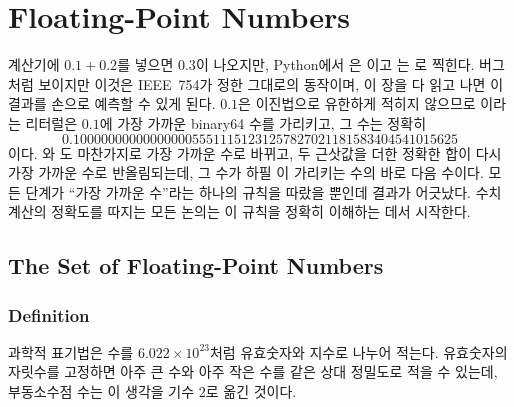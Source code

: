 \chapter{Floating-Point Numbers}
\label{ch:floating-point}


계산기에 $0.1+0.2$를 넣으면 $0.3$이 나오지만, Python에서 은 이고 는 로 찍힌다. 버그처럼 보이지만 이것은 IEEE~754가 정한 그대로의 동작이며, 이 장을 다 읽고 나면 이 결과를 손으로 예측할 수 있게 된다. $0.1$은 이진법으로 유한하게 적히지 않으므로 이라는 리터럴은 $0.1$에 가장 가까운 binary64 수를 가리키고, 그 수는 정확히
\[
0.1000000000000000055511151231257827021181583404541015625
\]
이다. 와 도 마찬가지로 가장 가까운 수로 바뀌고, 두 근삿값을 더한 정확한 합이 다시 가장 가까운 수로 반올림되는데, 그 수가 하필 이 가리키는 수의 바로 다음 수이다. 모든 단계가 ``가장 가까운 수''라는 하나의 규칙을 따랐을 뿐인데 결과가 어긋났다. 수치 계산의 정확도를 따지는 모든 논의는 이 규칙을 정확히 이해하는 데서 시작한다.

\section{The Set of Floating-Point Numbers}
\label{sec:fp-set}

\subsection{Definition}

과학적 표기법은 수를 $6.022\times10^{23}$처럼 유효숫자와 지수로 나누어 적는다. 유효숫자의 자릿수를 고정하면 아주 큰 수와 아주 작은 수를 같은 상대 정밀도로 적을 수 있는데, 부동소수점 수는 이 생각을 기수 $2$로 옮긴 것이다.

